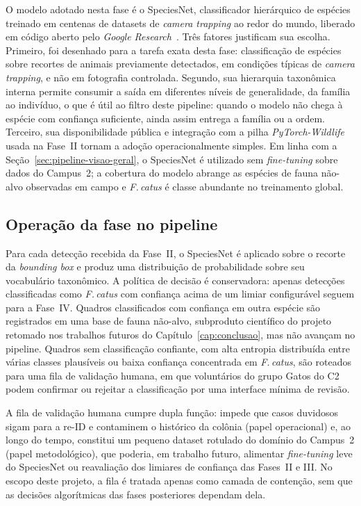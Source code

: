 O modelo adotado nesta fase é o SpeciesNet, classificador hierárquico de espécies treinado em centenas de datasets de \textit{camera trapping} ao redor do mundo, liberado em código aberto pelo \textit{Google Research}~\cite{google_speciesnet_blog}. Três fatores justificam sua escolha. Primeiro, foi desenhado para a tarefa exata desta fase: classificação de espécies sobre recortes de animais previamente detectados, em condições típicas de \textit{camera trapping}, e não em fotografia controlada. Segundo, sua hierarquia taxonômica interna permite consumir a saída em diferentes níveis de generalidade, da família ao indivíduo, o que é útil ao filtro deste pipeline: quando o modelo não chega à espécie com confiança suficiente, ainda assim entrega a família ou a ordem. Terceiro, sua disponibilidade pública e integração com a pilha \textit{PyTorch-Wildlife} usada na Fase~II tornam a adoção operacionalmente simples. Em linha com a Seção~\ref{sec:pipeline-visao-geral}, o SpeciesNet é utilizado sem \textit{fine-tuning} sobre dados do Campus~2; a cobertura do modelo abrange as espécies de fauna não-alvo observadas em campo e \textit{F.\,catus} é classe abundante no treinamento global.

\subsection*{Operação da fase no pipeline}

Para cada detecção recebida da Fase~II, o SpeciesNet é aplicado sobre o recorte da \textit{bounding box} e produz uma distribuição de probabilidade sobre seu vocabulário taxonômico. A política de decisão é conservadora: apenas detecções classificadas como \textit{F.\,catus} com confiança acima de um limiar configurável seguem para a Fase~IV. Quadros classificados com confiança em outra espécie são registrados em uma base de fauna não-alvo, subproduto científico do projeto retomado nos trabalhos futuros do Capítulo~\ref{cap:conclusao}, mas não avançam no pipeline. Quadros sem classificação confiante, com alta entropia distribuída entre várias classes plausíveis ou baixa confiança concentrada em \textit{F.\,catus}, são roteados para uma fila de validação humana, em que voluntários do grupo Gatos do C2 podem confirmar ou rejeitar a classificação por uma interface mínima de revisão.

A fila de validação humana cumpre dupla função: impede que casos duvidosos sigam para a re-ID e contaminem o histórico da colônia (papel operacional) e, ao longo do tempo, constitui um pequeno dataset rotulado do domínio do Campus~2 (papel metodológico), que poderia, em trabalho futuro, alimentar \textit{fine-tuning} leve do SpeciesNet ou reavaliação dos limiares de confiança das Fases~II e III. No escopo deste projeto, a fila é tratada apenas como camada de contenção, sem que as decisões algorítmicas das fases posteriores dependam dela.

